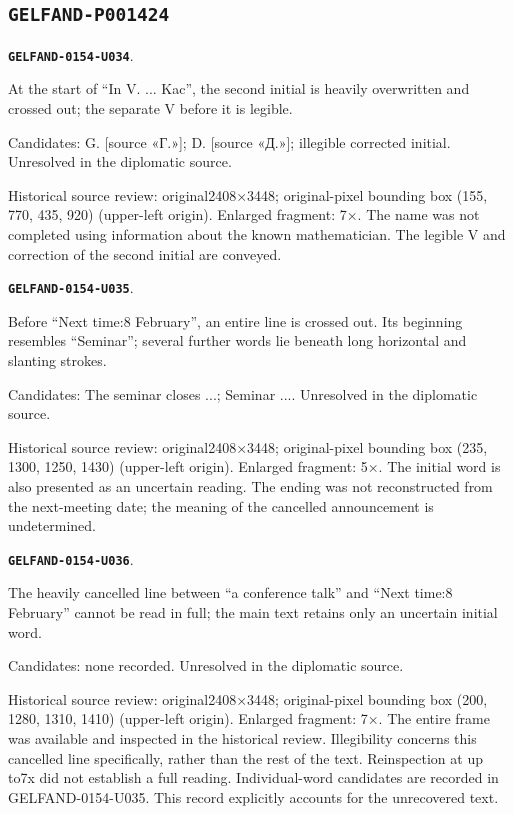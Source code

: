 \documentclass[11pt]{article}
\theoremstyle{definition}
\theoremstyle{remark}
\begin{document}
\subsection*{\texttt{GELFAND-P001424}}
\par\noindent\leavevmode{}\label{GELFAND-0154-U034}\label{GELFAND-P001424:kac-initial:note}\textbf{\texttt{GELFAND-0154-U034}}.\nopagebreak[4]\par
At the start of “In V. ... Kac”, the second initial is heavily overwritten and crossed out; the separate V before it is legible.\par
Candidates: G. [source «Г.»]; D. [source «Д.»]; illegible corrected initial. Unresolved in the diplomatic source.\par
Historical source review: original2408×3448; original-pixel bounding box (155, 770, 435, 920) (upper-left origin). Enlarged fragment: 7×. The name was not completed using information about the known mathematician. The legible V and correction of the second initial are conveyed.\par\medskip
\par\noindent\leavevmode{}\label{GELFAND-0154-U035}\label{GELFAND-P001424:cancelled-seminar-line:note}\textbf{\texttt{GELFAND-0154-U035}}.\nopagebreak[4]\par
Before “Next time:8 February”, an entire line is crossed out. Its beginning resembles “Seminar”; several further words lie beneath long horizontal and slanting strokes.\par
Candidates: The seminar closes ...; Seminar .... Unresolved in the diplomatic source.\par
Historical source review: original2408×3448; original-pixel bounding box (235, 1300, 1250, 1430) (upper-left origin). Enlarged fragment: 5×. The initial word is also presented as an uncertain reading. The ending was not reconstructed from the next-meeting date; the meaning of the cancelled announcement is undetermined.\par\medskip
\par\noindent\leavevmode{}\label{GELFAND-0154-U036}\label{GELFAND-P001424:cancelled-seminar-content:note}\textbf{\texttt{GELFAND-0154-U036}}.\nopagebreak[4]\par
The heavily cancelled line between “a conference talk” and “Next time:8 February” cannot be read in full; the main text retains only an uncertain initial word.\par
Candidates: none recorded. Unresolved in the diplomatic source.\par
Historical source review: original2408×3448; original-pixel bounding box (200, 1280, 1310, 1410) (upper-left origin). Enlarged fragment: 7×. The entire frame was available and inspected in the historical review. Illegibility concerns this cancelled line specifically, rather than the rest of the text. Reinspection at up to7x did not establish a full reading. Individual-word candidates are recorded in GELFAND-0154-U035. This record explicitly accounts for the unrecovered text.\par\medskip
\end{document}
